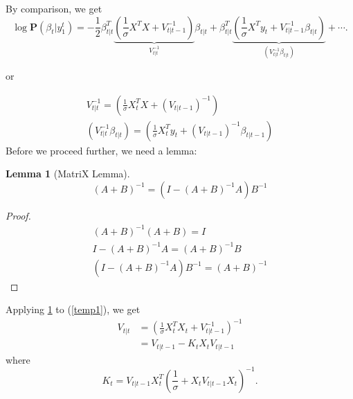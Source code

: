 \documentclass{article}
\theoremstyle{plain}
\newtheorem{lem}[thm]{Lemma}
\theoremstyle{definition}
\theoremstyle{remark}
\newcommand{\PP}{\mathbf{P}}
\begin{document}
By comparison, we get
\begin{equation}
\log \PP(\beta_t |  y^t_1) = - \frac12\beta^T_{t|t} \underbrace{ (\frac1\sigma X^T X + V_{t|t-1}^{-1})}_{V_{t|t}^{-1}} \beta_{t|t} + \beta^T_{t|t} \underbrace{( \frac1\sigma X^T y_t + V_{t|t-1}^{-1} \beta_{t|t})}_{ (V_{t|t} ^{-1} \beta_{t|t})} + \cdots.
\end{equation}

or

\begin{eqnarray}
 V_{t|t} ^{-1}  =  (\frac1\sigma X_t^T X + (V_{t|t-1})^{-1}) \label{temp1}\\
 (V_{t|t} ^{-1} \beta_{t|t}) = ( \frac1\sigma X_t^T y_t + (V_{t|t-1})^{-1} \beta_{t|t-1})
\end{eqnarray}
Before we proceed further, we need a lemma:
\begin{lem}[MatriX Lemma]
\begin{equation}
(A+B)^{-1} = (I - (A+B)^{-1} A)B^{-1}
\end{equation}
\label{ml}
\end{lem}
\begin{proof}
\begin{eqnarray*}
(A+B)^{-1}(A+B) = I\\
I - (A+B)^{-1} A = (A+B)^{-1} B\\
(I- (A+B)^{-1} A) B^{-1} = (A+B)^{-1}
\end{eqnarray*}
\end{proof}

Applying \ref{ml} to (\ref{temp1}), we get
\begin{equation}
\begin{split}
V_{t|t} &= ( \frac1\sigma X_t^T X_t + V_{t|t-1}^{-1})^{-1}\\
&=  V_{t|t-1} - K_t X_t V_{t|t-1}
\end{split}
\end{equation}
where
\[
K_t = V_{t|t-1} X_t^T (\frac1\sigma + X_t V_{t|t-1} X_t )^{-1}.
\]
\end{document}
